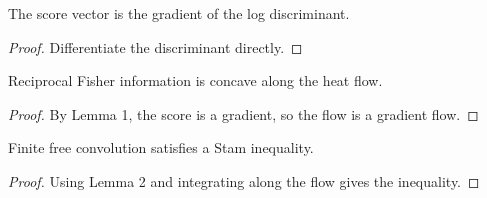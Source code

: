 \documentclass{article}
\begin{document}
\begin{lemma}
The score vector is the gradient of the log discriminant.
\end{lemma}
\begin{proof}
Differentiate the discriminant directly.
\end{proof}

\begin{lemma}
Reciprocal Fisher information is concave along the heat flow.
\end{lemma}
\begin{proof}
By Lemma 1, the score is a gradient, so the flow is a gradient flow.
\end{proof}

\begin{proposition}
Finite free convolution satisfies a Stam inequality.
\end{proposition}
\begin{proof}
Using Lemma 2 and integrating along the flow gives the inequality.
\end{proof}
\end{document}
